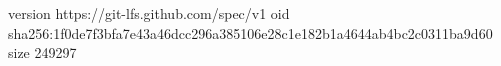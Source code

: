 version https://git-lfs.github.com/spec/v1
oid sha256:1f0de7f3bfa7e43a46dcc296a385106e28c1e182b1a4644ab4bc2c0311ba9d60
size 249297
